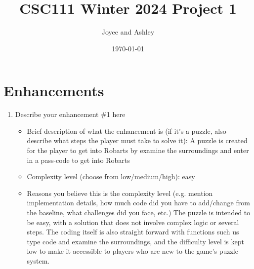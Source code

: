 \documentclass[11pt]{article}
\title{CSC111 Winter 2024 Project 1}
\author{Joyee and Ashley}
\date{\today}
\begin{document}
\maketitle

\section*{Enhancements}


\begin{enumerate}

\item Describe your enhancement \#1 here
	\begin{itemize}
	\item Brief description of what the enhancement is (if it's a puzzle, also describe what steps the player must take to solve it):
\newline A puzzle is created for the player to get into Robarts by examine the surroundings and enter in a pass-code to get into Robarts
	\item Complexity level (choose from low/medium/high): \newline easy
	\item Reasons you believe this is the complexity level (e.g. mention implementation details, how much code did you have to add/change from the baseline, what challenges did you face, etc.)
\newline The puzzle is intended to be easy, with a solution that does not involve complex logic or several steps. The coding itself is also straight forward with functions such us type code and examine the surroundings, and the difficulty level is kept low to make it accessible to players who are new to the game's puzzle system.
	\end{itemize}


\end{enumerate}
\end{document}
